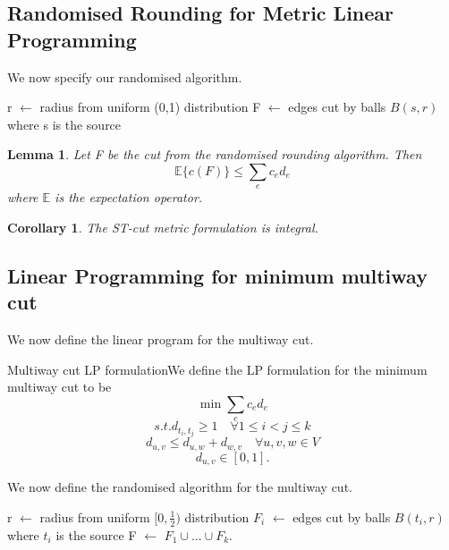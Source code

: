 \documentclass[twoside]{article}
\newtheorem{lemma}[theorem]{Lemma}
\newtheorem{corollary}[theorem]{Corollary}
\begin{document}
\subsection{Randomised Rounding for Metric Linear Programming}
We now specify our randomised algorithm.

\begin{algorithm}
\DontPrintSemicolon
{}
r $\gets$ radius from uniform (0,1) distribution\;
F $\gets$ edges cut by balls $B(s,r)$ where s is the source\;

\;
\caption{{\sc Randomised Rounding for ST-cut LP}}
\label{algo:duplicate}
\end{algorithm}

\begin{lemma}Let F be the cut from the randomised rounding algorithm. Then 
$$
\mathbb{E}\bigg\{c(F) \bigg\} \leq \sum_{e}c_ed_e
$$
where $\mathbb{E}$ is the expectation operator.
\end{lemma}

\begin{corollary}The ST-cut metric formulation is integral.
\end{corollary}

\subsection{Linear Programming for minimum multiway cut}
We now define the linear program for the multiway cut.
\begin{theorem_exam}{Multiway cut LP formulation}{}We define the LP formulation for the minimum multiway cut to be 
$$
\min \sum_{e}c_ed_e
$$
$$
s.t. d_{t_{i}, t_{j}} \geq 1 \quad \forall 1 \leq i < j \leq k
$$
$$
d_{u,v} \leq d_{u,w} + d_{w,v} \quad \forall u,v,w \in V
$$
$$
d_{u,v} \in [0,1].
$$
\end{theorem_exam}

We now define the randomised algorithm for the multiway cut.
\begin{algorithm}
\DontPrintSemicolon
{}
r $\gets$ radius from uniform $[0,\frac{1}{2})$ distribution\;
$F_i$ $\gets$ edges cut by balls $B(t_i,r)$ where $t_i$ is the source\;
F $\gets$ $F_1 \cup ... \cup F_k.$

\;
\caption{{\sc Randomised Rounding for multiway cut LP}}
\label{algo:duplicate}
\end{algorithm}
\end{document}
